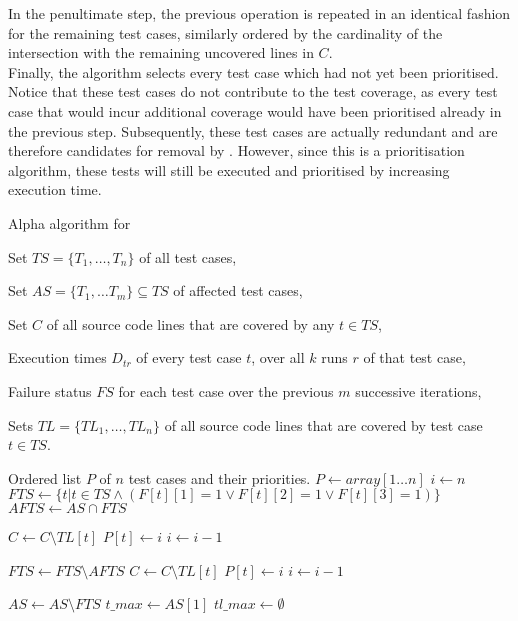 \noindent In the penultimate step, the previous operation is repeated in an identical fashion for the remaining test cases, similarly ordered by the cardinality of the intersection with the remaining uncovered lines in $C$.\\

\noindent Finally, the algorithm selects every test case which had not yet been prioritised. Notice that these test cases do not contribute to the test coverage, as every test case that would incur additional coverage would have been prioritised already in the previous step. Subsequently, these test cases are actually redundant and are therefore candidates for removal by \tsm{}. However, since this is a prioritisation algorithm, these tests will still be executed and prioritised by increasing execution time.

\begin{algorithm}[h!]
\caption{Alpha algorithm for \tcp{}}
\label{alg:alpha}
\begin{algorithmic}[1]
	 Set $TS = \{T_1, \dots, T_n\}$ of all test cases,
	
	Set $AS = \{T_1, \dots T_m\} \subseteq TS$ of affected test cases,
	
	Set $C$ of all source code lines that are covered by any $t \in TS$,
	
	Execution times $D_{tr}$ of every test case $t$, over all $k$ runs $r$ of that test case,
	
	Failure status $FS$ for each test case over the previous $m$ successive iterations,
	
	Sets $TL = \{TL_1, \dots, TL_n\}$ of all source code lines that are covered by test case $t \in TS$.
	
	 Ordered list $P$ of $n$ test cases and their priorities.
	\State $P \gets array[1 \dots n]$ 
	\State $i \gets n$
	\State $FTS \gets \{t \vert t \in TS \wedge (F[t][1] = 1 \vee F[t][2] = 1 \vee F[t][3] = 1)\}$
	\State $AFTS \gets AS \cap FTS$
	
	 
		\State $C \gets C \setminus TL[t]$
		\State $P[t] \gets i$
		\State $i \gets i - 1$
	\EndFor
	
	\State $FTS \gets FTS \setminus AFTS$
	 
		\State $C \gets C \setminus TL[t]$
		\State $P[t] \gets i$
		\State $i \gets i - 1$
	\EndFor
	
	\State $AS \gets AS \setminus FTS$
		\State $t\_max \gets AS[1]$ 
		\State $tl\_max \gets \emptyset$
		

\end{algorithmic}
\end{algorithm}
